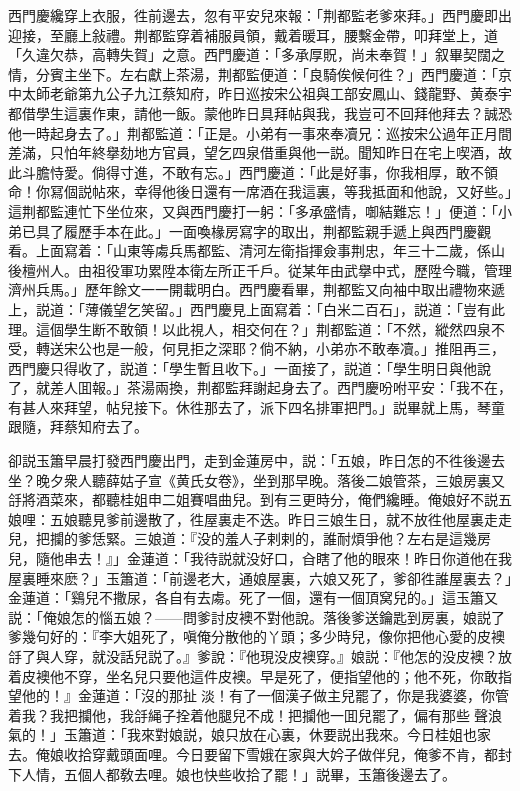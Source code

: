 西門慶纔穿上衣服，徃前邊去，忽有平安兒來報：「荆都監老爹來拜。」西門慶即出迎接，至廳上敍禮。荆都監穿着補服員領，戴着暖耳，腰繫金帶，叩拜堂上，道「久違欠恭，高轉失賀」之意。西門慶道：「多承厚貺，尚未奉賀！」叙畢契闊之情，分賓主坐下。左右獻上茶湯，荆都監便道：「良騎俟候何徃？」西門慶道：「京中太師老爺第九公子九江蔡知府，昨日巡按宋公祖與工部安鳳山、錢龍野、黄泰宇都借學生這裏作東，請他一飯。蒙他昨日具拜帖與我，我豈可不回拜他拜去？誠恐他一時起身去了。」荆都監道：「正是。小弟有一事來奉凟兄：巡按宋公過年正月間差滿，只怕年終擧劾地方官員，望乞四泉借重與他一説。聞知昨日在宅上喫酒，故此斗膽恃愛。倘得寸進，不敢有忘。」西門慶道：「此是好事，你我相厚，敢不領命！你冩個説帖來，幸得他後日還有一席酒在我這裏，等我抵面和他說，又好些。」這荆都監連忙下坐位來，又與西門慶打一躬：「多承盛情，啣結難忘！」便道：「小弟已具了履歷手本在此。」一面喚椽房寫字的取出，荆都監親手遞上與西門慶觀看。上面寫着：「山東等䖏兵馬都監、清河左衛指揮僉事荆忠，年三十二歲，係山後檀州人。由祖役軍功累陞本衛左所正千戶。従某年由武擧中式，歷陞今職，管理濟州兵馬。」歷年餘文一一開載明白。西門慶看畢，荆都監又向袖中取出禮物來遞上，説道：「薄儀望乞笑留。」西門慶見上面寫着：「白米二百石」，説道：「豈有此理。這個學生断不敢領！以此視人，相交何在？」荆都監道：「不然，縱然四泉不受，轉送宋公也是一般，何見拒之深耶？倘不納，小弟亦不敢奉凟。」推阻再三，西門慶只得收了，説道：「學生暫且收下。」一面接了，説道：「學生明日與他說了，就差人囬報。」茶湯兩換，荆都監拜謝起身去了。西門慶吩咐平安：「我不在，有甚人來拜望，帖兒接下。休徃那去了，派下四名排軍把門。」説畢就上馬，琴童跟隨，拜蔡知府去了。

卻説玉簫早晨打發西門慶出門，走到金蓮房中，説：「五娘，昨日怎的不徃後邊去坐？晚夕衆人聽薛姑子宣《黄氏女卷》，坐到那早晚。落後二娘管茶，三娘房裏又㧱將酒菜來，都聽桂姐申二姐賽唱曲兒。到有三更時分，俺們纔睡。俺娘好不説五娘哩：五娘聽見爹前邊散了，徃屋裏走不迭。昨日三娘生日，就不放徃他屋裏走走兒，把攔的爹恁緊。三娘道：『没的羞人子剌剌的，誰耐煩爭他？左右是這幾房兒，隨他串去！』」金蓮道：「我待説就没好口，㒲瞎了他的眼來！昨日你道他在我屋裏睡來麽？」玉簫道：「前邊老大，通娘屋裏，六娘又死了，爹卻徃誰屋裏去？」金蓮道：「鷄兒不撒尿，各自有去䖏。死了一個，還有一個頂窝兒的。」這玉簫又説：「俺娘怎的惱五娘？——問爹討皮襖不對他說。落後爹送鑰匙到房裏，娘説了爹幾句好的：『李大姐死了，嗔俺分散他的丫頭；多少時兒，像你把他心愛的皮襖㧱了與人穿，就没話兒説了。』爹說：『他現没皮襖穿。』娘説：『他怎的没皮襖？放着皮襖他不穿，坐名兒只要他這件皮襖。早是死了，便指望他的；他不死，你敢指望他的！』金蓮道：「沒的那扯𣭈淡！有了一個漢子做主兒罷了，你是我婆婆，你管着我？我把攔他，我㧱䋲子拴着他腿兒不成！把攔他一囬兒罷了，偏有那些𣭈聲浪氣的！」玉簫道：「我來對娘説，娘只放在心裏，休要説出我來。今日桂姐也家去。俺娘收拾穿戴頭面哩。今日要留下雪娥在家與大妗子做伴兒，俺爹不肯，都封下人情，五個人都敎去哩。娘也快些收拾了罷！」説畢，玉簫後邊去了。

